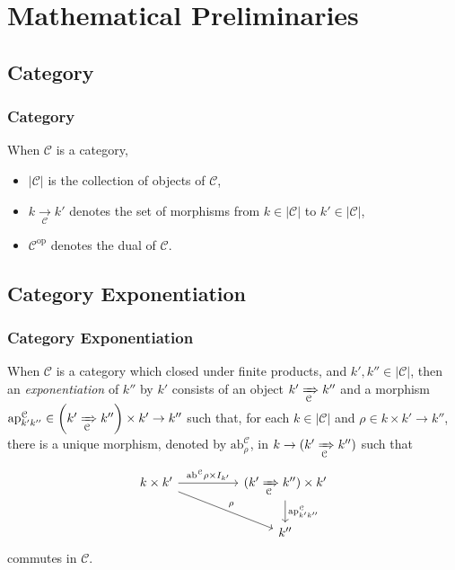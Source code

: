 \section{Mathematical Preliminaries}

\subsection{Category}

\begin{frame}[fragile]
    \frametitle{Category}
    
    When $\mathcal{C}$ is a category,
    \begin{itemize}
        \item $|\mathcal{C}|$ is the collection of objects of $\mathcal{C}$,
        \item $k \xrightarrow[\mathcal{C}]{} k'$ denotes the set of morphisms from $k \in |\mathcal{C}|$ to $k' \in |\mathcal{C}|$,
        \item $\mathcal{C}^{\mathrm{op}}$ denotes the dual of $\mathcal{C}$.
    \end{itemize}
\end{frame}

\subsection{Category Exponentiation}

\begin{frame}[fragile]
    \frametitle{Category Exponentiation}
    
    When $\mathcal{C}$ is a category which closed under finite products, and $k', k'' \in |\mathcal{C}|$, then an \textit{exponentiation} of $k''$ by $k'$ consists of an object $k' \xRightarrow[\mathcal{C}]{} k''$ and a morphism $\mathrm{ap}^\mathcal{C}_{k'k''} \in \left( k' \xRightarrow[\mathcal{C}]{} k'' \right) \times k' \rightarrow k''$ such that, for each $k \in |\mathcal{C}|$ and $\rho \in k \times k' \rightarrow k''$, there is a unique morphism, denoted by $\mathrm{ab}^\mathcal{C}_\rho$, in $k \rightarrow (k' \xRightarrow[\mathcal{C}]{} k'')$ such that
    \[
        \begin{tikzcd}[column sep = huge]
        k \times k' \arrow[r, "\mathrm{ab}^\mathcal{C} \rho \times I_{k'}"] \arrow[rd, "\rho"] & (k' \xRightarrow[\mathcal{C}]{} k'') \times k' \arrow[d, "\mathrm{ap}^\mathcal{C}_{k'k''}"] \\
        & k''
        \end{tikzcd}
    \]
    commutes in $\mathcal{C}$.
\end{frame}


